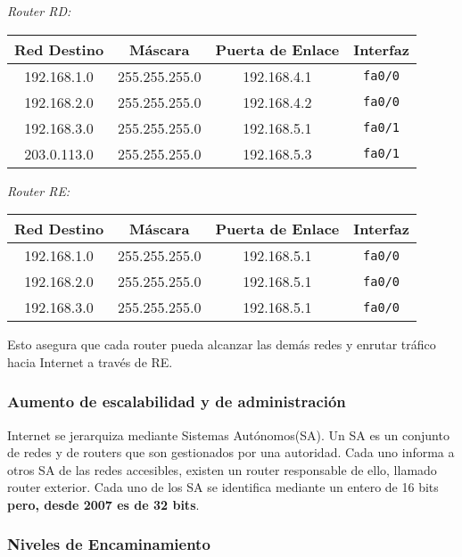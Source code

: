 \documentclass[a4paper,12pt]{article}
\begin{document}
\textit{Router RD:}
\begin{tabular}{|c|c|c|c|}
\hline
Red Destino & Máscara & Puerta de Enlace & Interfaz \\
\hline
192.168.1.0 & 255.255.255.0 & 192.168.4.1 & \texttt{fa0/0} \\
192.168.2.0 & 255.255.255.0 & 192.168.4.2 & \texttt{fa0/0} \\
192.168.3.0 & 255.255.255.0 & 192.168.5.1 & \texttt{fa0/1} \\
203.0.113.0 & 255.255.255.0 & 192.168.5.3 & \texttt{fa0/1} \\
\hline
\end{tabular}

\textit{Router RE:}
\begin{tabular}{|c|c|c|c|}
\hline
Red Destino & Máscara & Puerta de Enlace & Interfaz \\
\hline
192.168.1.0 & 255.255.255.0 & 192.168.5.1 & \texttt{fa0/0} \\
192.168.2.0 & 255.255.255.0 & 192.168.5.1 & \texttt{fa0/0} \\
192.168.3.0 & 255.255.255.0 & 192.168.5.1 & \texttt{fa0/0} \\
\hline
\end{tabular}

Esto asegura que cada router pueda alcanzar las demás redes y enrutar tráfico hacia Internet a través de RE.


\subsubsection*{Aumento de escalabilidad y de administración}

Internet se jerarquiza mediante Sistemas Autónomos(SA). Un SA es un conjunto de redes y de routers que son gestionados por una autoridad. Cada uno informa a otros SA de las redes accesibles, existen un router responsable de ello, llamado router exterior. Cada uno de los SA se identifica mediante un entero de 16 bits \textbf{pero, desde 2007 es de 32 bits}.


\subsubsection*{Niveles de Encaminamiento}
\end{document}
